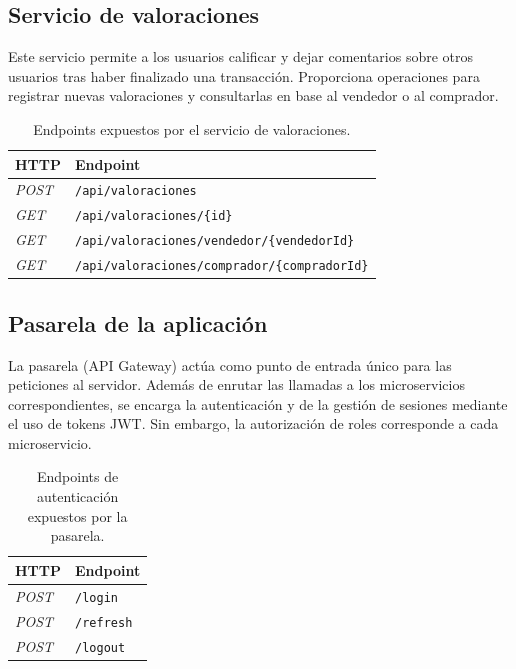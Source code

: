 \documentclass[11pt]{article}
\begin{document}
  \subsection{Servicio de valoraciones}

      Este servicio permite a los usuarios calificar y dejar comentarios sobre otros
      usuarios tras haber finalizado una transacción. Proporciona operaciones para
      registrar nuevas valoraciones y consultarlas en base al vendedor o al
      comprador.

      \setlength{\tabcolsep}{15pt}
      \begin{table}[H]
          \centering
          \begin{tabular}{l l}
              \hline
              \textbf{HTTP} & \textbf{Endpoint}                                    \\
              \hline
              \textit{POST} & \texttt{/api/valoraciones}                           \\
              \textit{GET}  & \texttt{/api/valoraciones/\{id\}}                    \\
              \textit{GET}  & \texttt{/api/valoraciones/vendedor/\{vendedorId\}}   \\
              \textit{GET}  & \texttt{/api/valoraciones/comprador/\{compradorId\}} \\
              \hline
          \end{tabular}
          \caption{Endpoints expuestos por el servicio de valoraciones.}
          \label{tab:endpoints-valoraciones}
      \end{table}

  \subsection{Pasarela de la aplicación}

      La pasarela (API Gateway) actúa como punto de entrada único para las peticiones
      al servidor. Además de enrutar las llamadas a los microservicios
      correspondientes, se encarga la autenticación y de la gestión de sesiones
      mediante el uso de tokens JWT. Sin embargo, la autorización de roles
      corresponde a cada microservicio.

      \setlength{\tabcolsep}{15pt}
      \begin{table}[h]
          \centering
          \begin{tabular}{l l}
              \hline
              \textbf{HTTP} & \textbf{Endpoint} \\
              \hline
              \textit{POST} & \texttt{/login}   \\
              \textit{POST} & \texttt{/refresh} \\
              \textit{POST} & \texttt{/logout}  \\
              \hline
          \end{tabular}
          \caption{Endpoints de autenticación expuestos por la pasarela.}
          \label{tab:endpoints-pasarela}
      \end{table}
\end{document}
